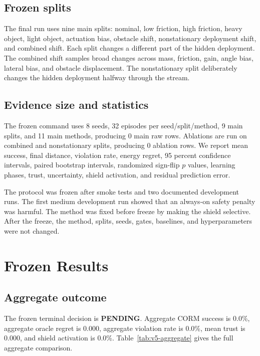 \documentclass{article}
\newcommand{\TerminalDecision}{PENDING}
\newcommand{\MainRawRows}{0}
\newcommand{\AblationRawRows}{0}
\newcommand{\CORMAggSuccess}{0.0}
\newcommand{\CORMAggRegret}{0.000}
\newcommand{\CORMAggViolation}{0.0}
\newcommand{\CORMAggTrust}{0.000}
\newcommand{\CORMAggShield}{0.0}
\begin{document}
\subsection{Frozen splits}

The final run uses nine main splits: nominal, low friction, high friction, heavy object, light object, actuation bias, obstacle shift, nonstationary deployment shift, and combined shift. Each split changes a different part of the hidden deployment. The combined shift samples broad changes across mass, friction, gain, angle bias, lateral bias, and obstacle displacement. The nonstationary split deliberately changes the hidden deployment halfway through the stream.

\subsection{Evidence size and statistics}

The frozen command uses 8 seeds, 32 episodes per seed/split/method, 9 main splits, and 11 main methods, producing \MainRawRows{} main raw rows. Ablations are run on combined and nonstationary splits, producing \AblationRawRows{} ablation rows. We report mean success, final distance, violation rate, energy regret, 95 percent confidence intervals, paired bootstrap intervals, randomized sign-flip $p$ values, learning phases, trust, uncertainty, shield activation, and residual prediction error.

The protocol was frozen after smoke tests and two documented development runs. The first medium development run showed that an always-on safety penalty was harmful. The method was fixed before freeze by making the shield selective. After the freeze, the method, splits, seeds, gates, baselines, and hyperparameters were not changed.

\section{Frozen Results}

\subsection{Aggregate outcome}

The frozen terminal decision is \textbf{\TerminalDecision}. Aggregate CORM success is \CORMAggSuccess{}\%, aggregate oracle regret is \CORMAggRegret{}, aggregate violation rate is \CORMAggViolation{}\%, mean trust is \CORMAggTrust{}, and shield activation is \CORMAggShield{}\%. Table~\ref{tab:v5-aggregate} gives the full aggregate comparison.
\end{document}
